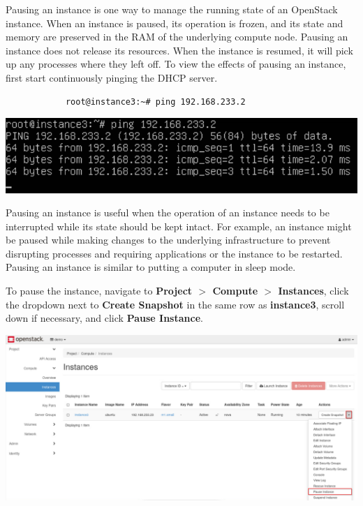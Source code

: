 \documentclass[letterpaper, 12pt]{article}
\begin{document}
\begin{enumerate}
    \begin{labstep}
        Pausing an instance is one way to manage the running state of an OpenStack instance.
        When an instance is paused, its operation is frozen, and its state and memory are preserved in the RAM of the underlying compute node.
        Pausing an instance does not release its resources.
        When the instance is resumed, it will pick up any processes where they left off.
        To view the effects of pausing an instance, first start continuously pinging the DHCP server.
        \begin{lstlisting}
            root@instance3:~# ping 192.168.233.2
        \end{lstlisting}

        \begin{center}
            \includegraphics[width=\linewidth]{images/part3/step7.png}
        \end{center}
    \end{labstep}

    \begin{tipbox}
        Pausing an instance is useful when the operation of an instance needs to be interrupted while its state should be kept intact.
        For example, an instance might be paused while making changes to the underlying infrastructure to prevent disrupting processes and requiring applications or the instance to be restarted.
        Pausing an instance is similar to putting a computer in sleep mode.
    \end{tipbox}

    \begin{labstep}
        To pause the instance, navigate to \textbf{Project $>$ Compute $>$ Instances}, click the dropdown next to \textbf{Create Snapshot} in the same row as \textbf{instance3}, scroll down if necessary, and click \textbf{Pause Instance}.

        \begin{center}
            \includegraphics[width=\linewidth]{images/part3/step8.png}
        \end{center}
    \end{labstep}


\end{enumerate}
\end{document}
